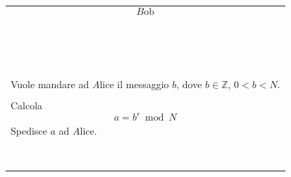 \documentclass[a4paper,12pt, oneside]{book}
\begin{document}
		\begin{minipage}{0.45\textwidth}
			\begin{tabular}{|p{\textwidth}}
				
				$$B\mbox{ob}$$\linebreak[2]\\\\\\\\\\\\\\\\\\\\\\\\\\\\\\\\\\
	
				Vuole mandare ad $A\mbox{lice}$ il messaggio $b$, dove $b \in \mathbb{Z}$, $0 < b < N$.\\\\
				Calcola $$a = b^r \bmod N $$\\
				Spedisce $a$ ad $A\mbox{lice}$.\\\\\\\\\\\\\\\\\\
				
				
			\end{tabular}
		\end{minipage}%
		
\end{document}
